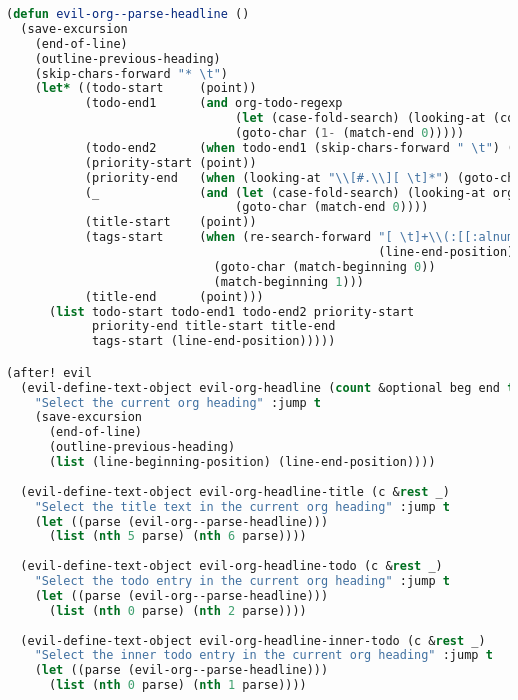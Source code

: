 \documentclass[11pt]{article}
\begin{document}
\begin{enumerate}
\begin{enumerate}
  \begin{lstlisting}[language=Lisp]
(defun evil-org--parse-headline ()
  (save-excursion
    (end-of-line)
    (outline-previous-heading)
    (skip-chars-forward "* \t")
    (let* ((todo-start     (point))
           (todo-end1      (and org-todo-regexp
                                (let (case-fold-search) (looking-at (concat org-todo-regexp " ")))
                                (goto-char (1- (match-end 0)))))
           (todo-end2      (when todo-end1 (skip-chars-forward " \t") (point)))
           (priority-start (point))
           (priority-end   (when (looking-at "\\[#.\\][ \t]*") (goto-char (match-end 0))))
           (_              (and (let (case-fold-search) (looking-at org-comment-string))
                                (goto-char (match-end 0))))
           (title-start    (point))
           (tags-start     (when (re-search-forward "[ \t]+\\(:[[:alnum:]_@#%:]+:\\)[ \t]*$"
                                                    (line-end-position) 'move)
                             (goto-char (match-beginning 0))
                             (match-beginning 1)))
           (title-end      (point)))
      (list todo-start todo-end1 todo-end2 priority-start
            priority-end title-start title-end
            tags-start (line-end-position)))))

(after! evil
  (evil-define-text-object evil-org-headline (count &optional beg end type)
    "Select the current org heading" :jump t
    (save-excursion
      (end-of-line)
      (outline-previous-heading)
      (list (line-beginning-position) (line-end-position))))
  
  (evil-define-text-object evil-org-headline-title (c &rest _)
    "Select the title text in the current org heading" :jump t
    (let ((parse (evil-org--parse-headline)))
      (list (nth 5 parse) (nth 6 parse))))
  
  (evil-define-text-object evil-org-headline-todo (c &rest _)
    "Select the todo entry in the current org heading" :jump t
    (let ((parse (evil-org--parse-headline)))
      (list (nth 0 parse) (nth 2 parse))))
  
  (evil-define-text-object evil-org-headline-inner-todo (c &rest _)
    "Select the inner todo entry in the current org heading" :jump t
    (let ((parse (evil-org--parse-headline)))
      (list (nth 0 parse) (nth 1 parse))))
  

\end{lstlisting}
\end{enumerate}
\end{enumerate}
\end{document}
